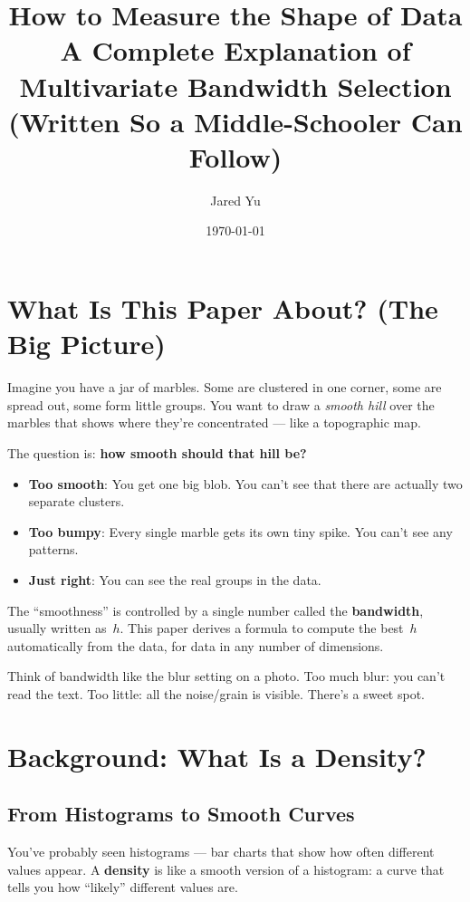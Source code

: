 \documentclass[12pt]{article}
\title{How to Measure the Shape of Data\\[0.5em]\large A Complete Explanation of Multivariate Bandwidth Selection\\(Written So a Middle-Schooler Can Follow)}
\author{Jared Yu}
\date{\today}
\newcommand{\keyword}[1]{\textbf{\textcolor{blue!70!black}{#1}}}
\newcommand{\analogy}[1]{\begin{tcolorbox}[colback=green!5,colframe=green!50!black,title=Analogy]\small #1\end{tcolorbox}}
\begin{document}
\maketitle

\tableofcontents
\newpage

\section{What Is This Paper About? (The Big Picture)}

Imagine you have a jar of marbles. Some are clustered in one corner, some are spread out, some form little groups. You want to draw a \emph{smooth hill} over the marbles that shows where they're concentrated --- like a topographic map.

The question is: \textbf{how smooth should that hill be?}

\begin{itemize}
\item \textbf{Too smooth}: You get one big blob. You can't see that there are actually two separate clusters.
\item \textbf{Too bumpy}: Every single marble gets its own tiny spike. You can't see any patterns.
\item \textbf{Just right}: You can see the real groups in the data.
\end{itemize}

The ``smoothness'' is controlled by a single number called the \keyword{bandwidth}, usually written as~$h$. This paper derives a formula to compute the best~$h$ automatically from the data, for data in any number of dimensions.

\analogy{Think of bandwidth like the blur setting on a photo. Too much blur: you can't read the text. Too little: all the noise/grain is visible. There's a sweet spot.}

\section{Background: What Is a Density?}

\subsection{From Histograms to Smooth Curves}

You've probably seen histograms --- bar charts that show how often different values appear. A \keyword{density} is like a smooth version of a histogram: a curve that tells you how ``likely'' different values are.
\end{document}
